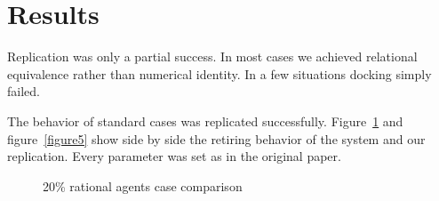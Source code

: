 \documentclass[runningheads,a4paper]{article}
\begin{document}
\section{Results}
Replication was only a partial success. 
In most cases we achieved relational equivalence \cite{springerlink:10.1007/BF01299065} rather than numerical identity.
In a few situations docking simply failed.

The behavior of standard cases was replicated successfully.
Figure~\ref{figure4} and figure~\ref{figure5} show side by side the retiring behavior of the system and our replication.
Every parameter was set as in the original paper.

\begin{figure}
\centering

\caption{20\% rational agents case comparison}
\label{figure4}
\end{figure}
\end{document}
